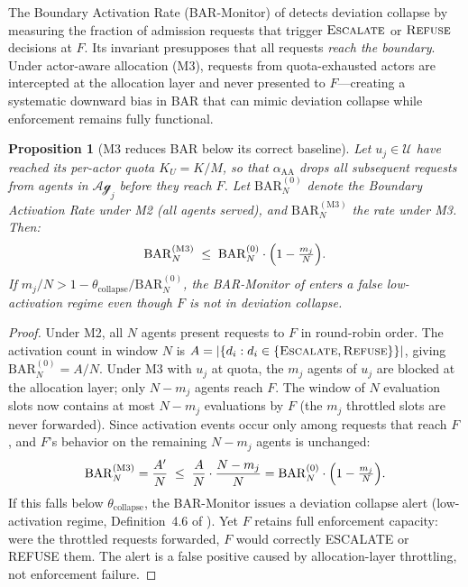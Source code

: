 \documentclass[11pt]{article}
\theoremstyle{plain}
\newtheorem{proposition}[theorem]{Proposition}
\theoremstyle{definition}
\theoremstyle{remark}
\newcommand{\Refuse}{\textsc{Refuse}}
\newcommand{\Escalate}{\textsc{Escalate}}
\newcommand{\Agents}{\mathcal{Ag}}         %
\newcommand{\Actors}{\mathcal{U}}          %
\newcommand{\Kcap}{K}                      %
\newcommand{\alloc}{\alpha}                %
\begin{document}
The Boundary Activation Rate (BAR-Monitor) of \citet{fernandez2026b}
detects deviation collapse by measuring the fraction of admission
requests that trigger $\Escalate$ or $\Refuse$ decisions at $F$.
Its invariant presupposes that all requests \emph{reach the boundary}.
Under actor-aware allocation (M3), requests from quota-exhausted
actors are intercepted at the allocation layer and never presented to
$F$---creating a systematic downward bias in BAR that can mimic
deviation collapse while enforcement remains fully functional.

\begin{proposition}[M3 reduces BAR below its correct baseline]
\label{prop:bar-m3}
Let $u_j \in \Actors$ have reached its per-actor quota $K_U =
\Kcap/M$, so that $\alloc_{\mathrm{AA}}$ drops all subsequent
requests from agents in $\Agents_j$ before they reach $F$.
Let $\mathrm{BAR}_N^{(0)}$ denote the Boundary Activation Rate
under M2 (all agents served), and $\mathrm{BAR}_N^{(\mathrm{M3})}$
the rate under M3.  Then:
\[
  \mathrm{BAR}_N^{(\mathrm{M3})}
  \;\leq\;
  \mathrm{BAR}_N^{(0)} \cdot \Bigl(1 - \tfrac{m_j}{N}\Bigr).
\]
If $m_j/N > 1 - \theta_{\mathrm{collapse}}/\mathrm{BAR}_N^{(0)}$,
the BAR-Monitor of \citet{fernandez2026b} enters a false low-activation
regime even though $F$ is not in deviation collapse.
\end{proposition}

\begin{proof}
Under M2, all $N$ agents present requests to $F$ in round-robin order.
The activation count in window $N$ is
$A = |\{d_i : d_i \in \{\Escalate, \Refuse\}\}|$, giving
$\mathrm{BAR}_N^{(0)} = A/N$.
Under M3 with $u_j$ at quota, the $m_j$ agents of $u_j$ are blocked
at the allocation layer; only $N - m_j$ agents reach $F$.
The window of $N$ evaluation slots now contains at most $N - m_j$
evaluations by $F$ (the $m_j$ throttled slots are never forwarded).
Since activation events occur only among requests that reach $F$,
and $F$'s behavior on the remaining $N - m_j$ agents is unchanged:
\[
  \mathrm{BAR}_N^{(\mathrm{M3})} = \frac{A'}{N}
  \;\leq\; \frac{A}{N} \cdot \frac{N - m_j}{N}
  = \mathrm{BAR}_N^{(0)} \cdot \Bigl(1 - \tfrac{m_j}{N}\Bigr).
\]
If this falls below $\theta_{\mathrm{collapse}}$, the BAR-Monitor
issues a deviation collapse alert (low-activation regime,
Definition~4.6 of \citet{fernandez2026b}).  Yet $F$ retains full
enforcement capacity: were the throttled requests forwarded, $F$
would correctly ESCALATE or REFUSE them.  The alert is a false positive
caused by allocation-layer throttling, not enforcement failure.
\end{proof}
\end{document}
